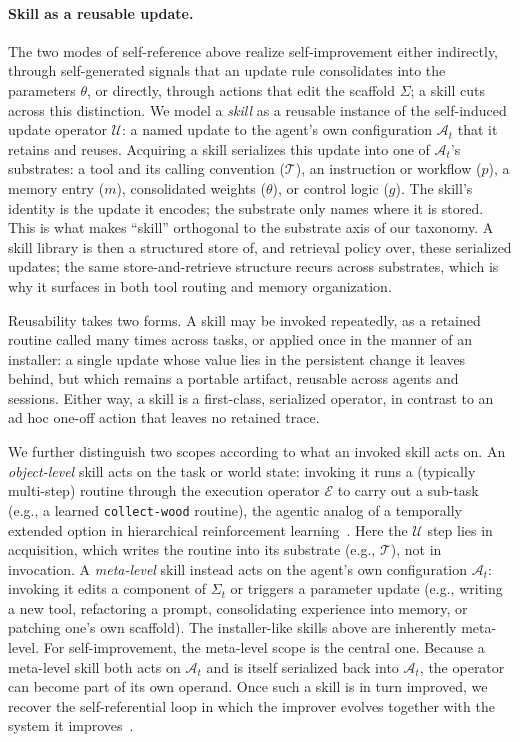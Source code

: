 \paragraph{Skill as a reusable update.}
The two modes of self-reference above realize self-improvement either indirectly, through self-generated signals that an update rule consolidates into the parameters $\theta$, or directly, through actions that edit the scaffold $\Sigma$; a skill cuts across this distinction. We model a \emph{skill} as a reusable instance of the self-induced update operator $\mathcal{U}$: a named update to the agent's own configuration $\mathcal{A}_t$ that it retains and reuses. Acquiring a skill serializes this update into one of $\mathcal{A}_t$'s substrates: a tool and its calling convention ($\mathcal{T}$), an instruction or workflow ($p$), a memory entry ($m$), consolidated weights ($\theta$), or control logic ($g$). The skill's identity is the update it encodes; the substrate only names where it is stored. This is what makes ``skill'' orthogonal to the substrate axis of our taxonomy. A skill library is then a structured store of, and retrieval policy over, these serialized updates; the same store-and-retrieve structure recurs across substrates, which is why it surfaces in both tool routing and memory organization.

Reusability takes two forms. A skill may be invoked repeatedly, as a retained routine called many times across tasks, or applied once in the manner of an installer: a single update whose value lies in the persistent change it leaves behind, but which remains a portable artifact, reusable across agents and sessions. Either way, a skill is a first-class, serialized operator, in contrast to an ad hoc one-off action that leaves no retained trace.

We further distinguish two scopes according to what an invoked skill acts on. An \emph{object-level} skill acts on the task or world state: invoking it runs a (typically multi-step) routine through the execution operator $\mathcal{E}$ to carry out a sub-task (e.g., a learned \texttt{collect-wood} routine), the agentic analog of a temporally extended option in hierarchical reinforcement learning~\citep{sutton1999between, bacon2017option}. Here the $\mathcal{U}$ step lies in acquisition, which writes the routine into its substrate (e.g., $\mathcal{T}$), not in invocation. A \emph{meta-level} skill instead acts on the agent's own configuration $\mathcal{A}_t$: invoking it edits a component of $\Sigma_t$ or triggers a parameter update (e.g., writing a new tool, refactoring a prompt, consolidating experience into memory, or patching one's own scaffold). The installer-like skills above
are inherently meta-level. For self-improvement, the meta-level scope is the central one. Because a meta-level skill both acts on $\mathcal{A}_t$ and is itself serialized back into $\mathcal{A}_t$, the operator can become part of its own operand. Once such a skill is in turn improved, we recover the self-referential loop in which the improver evolves together with the system it improves~\citep{schmidhuber1987selfreferential, schmidhuber1993self,schmidhuber2003godel}.


